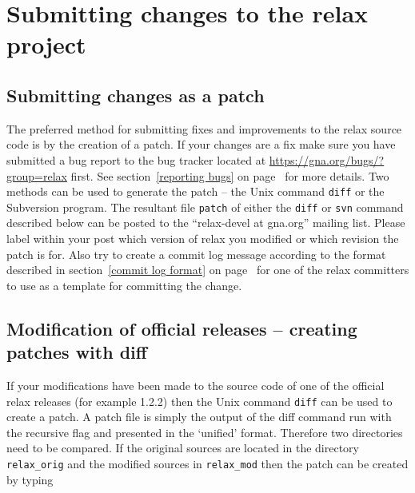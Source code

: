 \section{Submitting changes to the relax project}


\subsection{Submitting changes as a patch}

The preferred method for submitting fixes and improvements to the relax source code is by the creation of a patch.  If your changes are a fix make sure you have submitted a bug report to the bug tracker located at \href{https://gna.org/bugs/?group=relax}{https://gna.org/bugs/?group=relax} first.  See section~\ref{reporting bugs} on page~\pageref{reporting bugs} for more details.  Two methods can be used to generate the patch -- the Unix command \texttt{diff} or the Subversion program.  The resultant file \texttt{patch} of either the \texttt{diff} or \texttt{svn} command described below can be posted to the ``relax-devel at gna.org'' mailing list.  Please label within your post which version of relax you modified or which revision the patch is for.  Also try to create a commit log message according to the format described in section~\ref{commit log format} on page~\pageref{commit log format} for one of the relax committers to use as a template for committing the change.



\subsection{Modification of official releases -- creating patches with diff}

If your modifications have been made to the source code of one of the official relax releases (for example 1.2.2) then the Unix command \texttt{diff} can be used to create a patch.  A patch file is simply the output of the diff command run with the recursive flag and presented in the `unified' format.  Therefore two directories need to be compared.  If the original sources are located in the directory \texttt{relax\_orig} and the modified sources in \texttt{relax\_mod} then the patch can be created by typing

